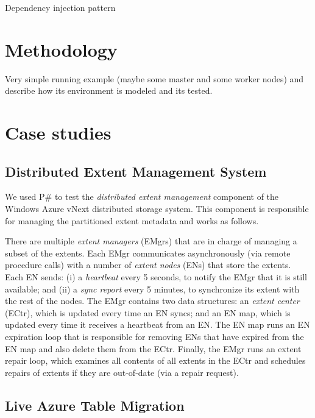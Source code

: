 \documentclass{sig-alternate}
\newcommand{\psharp}{P\#\xspace}
\begin{document}


Dependency injection pattern


\section{Methodology}
\label{sec:methodology}

%

Very simple running example (maybe some master and some worker nodes) and describe how its environment is modeled and its tested.

\section{Case studies}
\label{sec:cases}

\subsection{Distributed Extent Management System}

We used \psharp to test the \emph{distributed extent management} component of the Windows Azure vNext distributed storage system. This component is responsible for managing the partitioned extent metadata and works as follows.

There are multiple \emph{extent managers} (EMgrs) that are in charge of managing a subset of the extents. Each EMgr communicates asynchronously (via remote procedure calls) with a number of \emph{extent nodes} (ENs) that store the extents. Each EN sends: (i) a \emph{heartbeat} every 5 seconds, to notify the EMgr that it is still available; and (ii) a \emph{sync report} every 5 minutes, to synchronize its extent with the rest of the nodes. The EMgr contains two data structures: an \emph{extent center} (ECtr), which is updated every time an EN syncs; and an EN map, which is updated every time it receives a heartbeat from an EN. The EN map runs an EN expiration loop that is responsible for removing ENs that have expired from the EN map and also delete them from the ECtr. Finally, the EMgr runs an extent repair loop, which examines all contents of all extents in the ECtr and schedules repairs of extents if they are out-of-date (via a repair request).

\subsection{Live Azure Table Migration}
\end{document}
